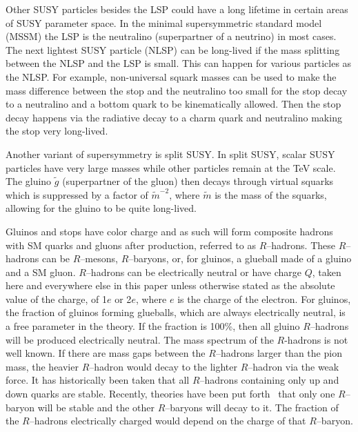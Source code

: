 Other SUSY particles besides the LSP could have a long lifetime in certain areas of SUSY parameter space. In the minimal supersymmetric standard model (MSSM) the LSP is the
neutralino (superpartner of a neutrino) in most cases. The next lightest SUSY particle (NLSP) can be long-lived if the mass splitting between the NLSP and the LSP is small.
This can happen for various particles as the NLSP. 
For example, non-universal squark masses can be used to make the mass difference between the stop and the neutralino too small for the stop decay to a neutralino and
a bottom quark to be kinematically allowed.
Then the stop decay happens via the radiative decay to a charm quark and neutralino making the stop very long-lived.

Another variant of supersymmetry is split SUSY. In split SUSY, scalar SUSY particles have very large masses while other particles remain at the TeV scale.
The gluino $\tilde{g}$ (superpartner of the gluon) then decays through virtual squarks which 
is suppressed by a factor of $\tilde{m}^{-2}$, where $\tilde{m}$ is the mass of the squarks, allowing for the gluino to be quite long-lived.

Gluinos and stops have color charge and as such will form composite hadrons with SM quarks and gluons after production, referred to as $R$--hadrons.
These $R$--hadrons can be $R$--mesons, $R$--baryons, or, for gluinos, a glueball made of a gluino and a SM gluon.
$R$--hadrons can be electrically neutral or have charge $Q$, taken here and everywhere else in this paper unless otherwise stated as the absolute value of the charge,
of 1$e$ or 2$e$, where $e$ is the charge of the electron.
For gluinos, the fraction of gluinos forming glueballs, which are always electrically neutral, is
a free parameter in the theory. If the fraction is 100\%, then all gluino $R$--hadrons will be produced electrically neutral.
The mass spectrum of the $R$-hadrons is not well known.
If there are mass gaps between the $R$--hadrons larger than the pion mass, the heavier $R$--hadron would decay to the lighter $R$--hadron via the weak force.
It has historically been taken that all $R$--hadrons containing only up and down quarks are stable.
Recently, theories have been put forth~\cite{Mackeprang:2009ad} that only one $R$--baryon will be stable and the other $R$--baryons will decay to it.
The fraction of the $R$--hadrons electrically charged would depend on the charge of that $R$--baryon.


